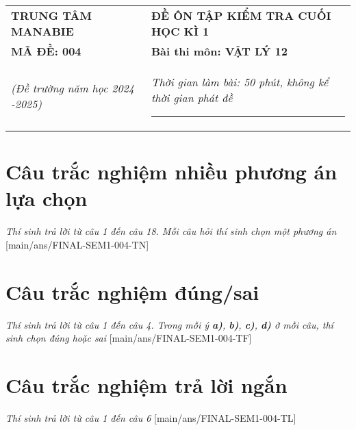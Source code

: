 \begin{tabular}{M{6.5cm}M{11cm}}
	\textbf{TRUNG TÂM MANABIE}& \textbf{ĐỀ ÔN TẬP KIỂM TRA CUỐI HỌC KÌ 1}\\
	\textbf{MÃ ĐỀ: 004}& \textbf{Bài thi môn: VẬT LÝ 12}\\
	\textit{(Đề trường  năm học 2024 -2025)}& \textit{Thời gian làm bài: 50 phút, không kể thời gian phát đề}
	
	\noindent\rule{4cm}{0.8pt} \\
\end{tabular}
\setcounter{section}{0}
\section{Câu trắc nghiệm nhiều phương án lựa chọn}
\textit{Thí sinh trả lời từ câu 1 đến câu 18. Mỗi câu hỏi thí sinh chọn một phương án}
\setcounter{ex}{0}
[main/ans/FINAL-SEM1-004-TN]
\begin{ex}
	
	\choice
	{}
	{}
	{}
	{}
	\loigiai{}
\end{ex}


\section{Câu trắc nghiệm đúng/sai} 
\textit{Thí sinh trả lời từ câu 1 đến câu 4. Trong mỗi ý \textbf{a)}, \textbf{b)}, \textbf{c)}, \textbf{d)} ở mỗi câu, thí sinh chọn đúng hoặc sai}
\setcounter{ex}{0}
[main/ans/FINAL-SEM1-004-TF]
\begin{ex}
	
	\choiceTF[t]
	{}
	{}
	{}
	{}
	\loigiai{}
\end{ex}



\section{Câu trắc nghiệm trả lời ngắn} \textit{Thí sinh trả lời từ câu 1 đến câu 6}
\setcounter{ex}{0}
[main/ans/FINAL-SEM1-004-TL]
\begin{ex}
	
	\shortans[oly]{ }
	\loigiai{
		
	}
\end{ex}


